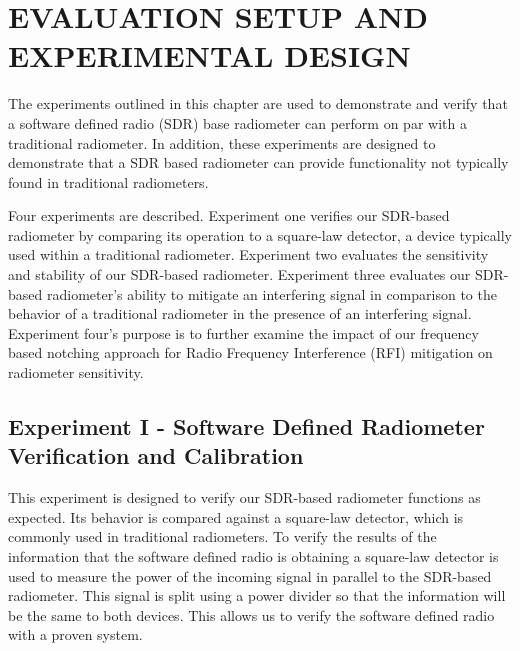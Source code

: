 

\chapter{EVALUATION SETUP AND EXPERIMENTAL DESIGN}\label{ch:exp_design}
The experiments outlined in this chapter are used to demonstrate and verify that a software defined radio (SDR) base radiometer can perform on par with a traditional radiometer.  In addition, these experiments are designed to demonstrate that a SDR based radiometer can provide functionality not typically found in traditional radiometers. 

Four experiments are described.  Experiment one verifies our SDR-based radiometer by comparing its operation to a square-law detector, a device typically used within a traditional radiometer.  Experiment two evaluates the sensitivity and stability of our SDR-based radiometer.  Experiment three evaluates our SDR-based radiometer's ability to mitigate an interfering signal in comparison to the behavior of a traditional radiometer in the presence of an interfering signal.  Experiment four's purpose is to further examine the impact of our frequency based notching approach for Radio Frequency Interference (RFI) mitigation on radiometer sensitivity.

\section{Experiment I - Software Defined Radiometer Verification and Calibration}\label{Exp1}

This experiment is designed to verify our SDR-based radiometer functions as expected.  Its behavior is compared against a square-law detector, which is commonly used in traditional radiometers.  To verify the results of the information that the software defined radio is obtaining a square-law detector is used to measure the power of the incoming signal in parallel to the SDR-based radiometer.  This signal is split using a power divider so that the information will be the same to both devices.  This allows us to verify the software defined radio with a proven system.  

